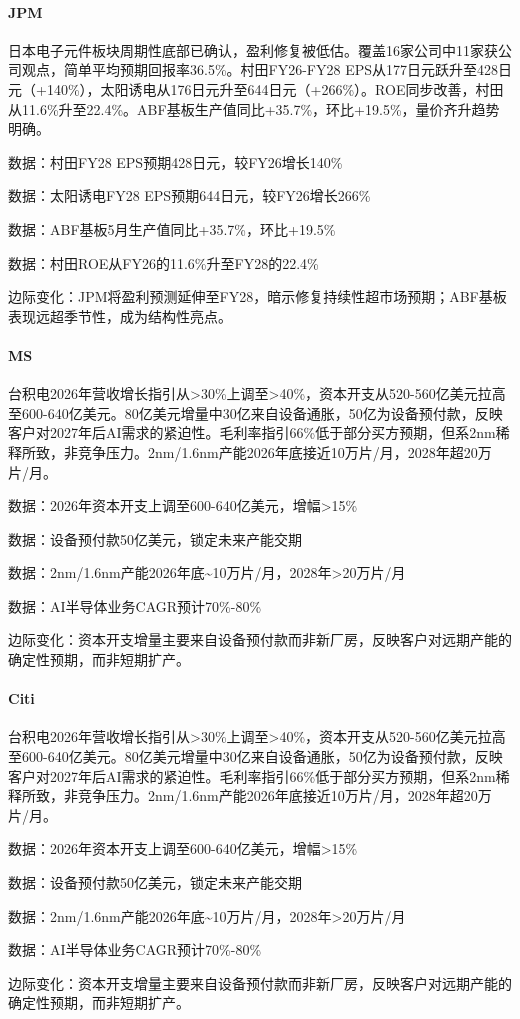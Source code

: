 \documentclass[11pt]{ctexart}
\begin{document}
\paragraph{JPM} 日本电子元件板块周期性底部已确认，盈利修复被低估。覆盖16家公司中11家获公司观点，简单平均预期回报率36.5\%。村田FY26-FY28 EPS从177日元跃升至428日元（+140\%），太阳诱电从176日元升至644日元（+266\%）。ROE同步改善，村田从11.6\%升至22.4\%。ABF基板生产值同比+35.7\%，环比+19.5\%，量价齐升趋势明确。
{\small\color{refgray}数据：村田FY28 EPS预期428日元，较FY26增长140\%\par}
{\small\color{refgray}数据：太阳诱电FY28 EPS预期644日元，较FY26增长266\%\par}
{\small\color{refgray}数据：ABF基板5月生产值同比+35.7\%，环比+19.5\%\par}
{\small\color{refgray}数据：村田ROE从FY26的11.6\%升至FY28的22.4\%\par}
{\small\color{refgray}边际变化：JPM将盈利预测延伸至FY28，暗示修复持续性超市场预期；ABF基板表现远超季节性，成为结构性亮点。\par}
\paragraph{MS} 台积电2026年营收增长指引从>30\%上调至>40\%，资本开支从520-560亿美元拉高至600-640亿美元。80亿美元增量中30亿来自设备通胀，50亿为设备预付款，反映客户对2027年后AI需求的紧迫性。毛利率指引66\%低于部分买方预期，但系2nm稀释所致，非竞争压力。2nm/1.6nm产能2026年底接近10万片/月，2028年超20万片/月。
{\small\color{refgray}数据：2026年资本开支上调至600-640亿美元，增幅>15\%\par}
{\small\color{refgray}数据：设备预付款50亿美元，锁定未来产能交期\par}
{\small\color{refgray}数据：2nm/1.6nm产能2026年底\textasciitilde{}10万片/月，2028年>20万片/月\par}
{\small\color{refgray}数据：AI半导体业务CAGR预计70\%-80\%\par}
{\small\color{refgray}边际变化：资本开支增量主要来自设备预付款而非新厂房，反映客户对远期产能的确定性预期，而非短期扩产。\par}
\paragraph{Citi} 台积电2026年营收增长指引从>30\%上调至>40\%，资本开支从520-560亿美元拉高至600-640亿美元。80亿美元增量中30亿来自设备通胀，50亿为设备预付款，反映客户对2027年后AI需求的紧迫性。毛利率指引66\%低于部分买方预期，但系2nm稀释所致，非竞争压力。2nm/1.6nm产能2026年底接近10万片/月，2028年超20万片/月。
{\small\color{refgray}数据：2026年资本开支上调至600-640亿美元，增幅>15\%\par}
{\small\color{refgray}数据：设备预付款50亿美元，锁定未来产能交期\par}
{\small\color{refgray}数据：2nm/1.6nm产能2026年底\textasciitilde{}10万片/月，2028年>20万片/月\par}
{\small\color{refgray}数据：AI半导体业务CAGR预计70\%-80\%\par}
{\small\color{refgray}边际变化：资本开支增量主要来自设备预付款而非新厂房，反映客户对远期产能的确定性预期，而非短期扩产。\par}
\end{document}
